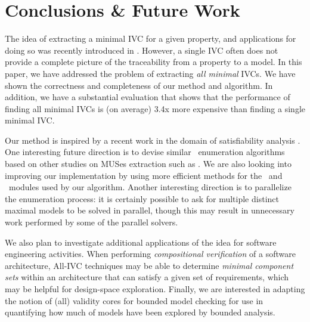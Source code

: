 \section{Conclusions \& Future Work}
\label{sec:conc}
The idea of extracting a minimal IVC for a given property, and applications for doing so was recently introduced in \cite{Ghass16}.  However, a single IVC often does not provide a complete picture of the traceability from a property to a model.  In this paper, we have addressed the problem of extracting {\em all minimal} IVCs. We have shown
the correctness and completeness of our method and algorithm.  In addition, we have a substantial evaluation that shows that the performance of finding all minimal IVCs is (on average) 3.4x more expensive than finding a single minimal IVC.

Our method is inspired by a recent work in the domain of satisfiability analysis \cite{marco2016fast}. One interesting future direction is to devise similar \mivc\ enumeration algorithms based on other studies on MUSes extraction such as \cite{Bacchus2016, nadel2014accelerated}.  We are also looking into improving our implementation by using more  efficient methods for the \isadeq ~and \getivc ~modules used by our algorithm. Another interesting direction is to parallelize the enumeration process: it is certainly possible to ask for multiple distinct maximal models to be solved in parallel, though this may result in unnecessary work performed by some of the parallel solvers.

We also plan to investigate additional applications of the idea for software engineering activities.  When performing {\em compositional verification} of a software architecture, All-IVC techniques may be able to determine {\em minimal component sets} within an architecture that can satisfy a given set of requirements, which may be helpful for design-space exploration.
%
Finally, we are interested in adapting the notion of (all) validity cores for bounded model checking for use in quantifying how much of models have been explored by bounded analysis. 
